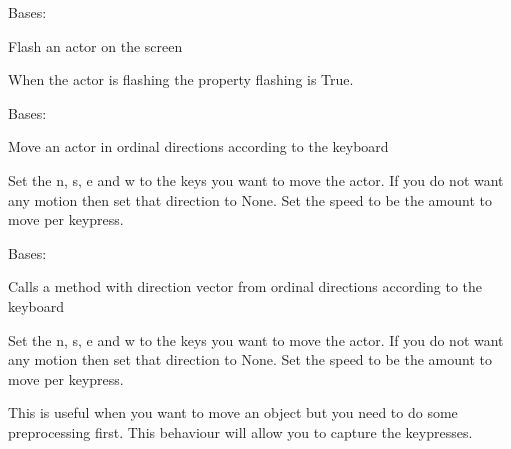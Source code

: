 \documentclass[letterpaper,10pt,english]{sphinxmanual}
\begin{document}
\begin{fulllineitems}
\label{blocks:serge.blocks.behaviours.FlashFor}
Bases: {\hyperref[blocks:serge.blocks.behaviours.Behaviour]{}}

Flash an actor on the screen

When the actor is flashing the property flashing is True.

\end{fulllineitems}


\begin{fulllineitems}
\label{blocks:serge.blocks.behaviours.KeyboardNSEW}
Bases: {\hyperref[blocks:serge.blocks.behaviours.Behaviour]{}}

Move an actor in ordinal directions according to the keyboard

Set the n, s, e and w to the keys you want to move the actor. If you
do not want any motion then set that direction to None. Set the speed
to be the amount to move per keypress.

\end{fulllineitems}


\begin{fulllineitems}
\label{blocks:serge.blocks.behaviours.KeyboardNSEWToVectorCallback}
Bases: {\hyperref[blocks:serge.blocks.behaviours.Behaviour]{}}

Calls a method with direction vector from ordinal directions according to the keyboard

Set the n, s, e and w to the keys you want to move the actor. If you
do not want any motion then set that direction to None. Set the speed
to be the amount to move per keypress.

This is useful when you want to move an object but you need to do
some preprocessing first. This behaviour will allow you to capture the
keypresses.

\end{fulllineitems}
\end{document}
